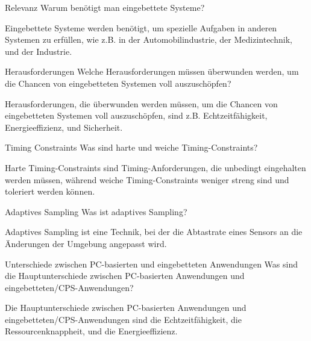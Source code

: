 \documentclass{article}
\begin{document}
\begin{exercise}{Relevanz}
  Warum benötigt man eingebettete Systeme?

  \begin{solution}
    Eingebettete Systeme werden benötigt, um spezielle Aufgaben in anderen Systemen zu erfüllen, wie z.B. in der Automobilindustrie, der Medizintechnik, und der Industrie.
  \end{solution}
\end{exercise}

\begin{exercise}{Herausforderungen}
  Welche Herausforderungen müssen überwunden werden, um die Chancen von eingebetteten Systemen voll auszuschöpfen?

  \begin{solution}
    Herausforderungen, die überwunden werden müssen, um die Chancen von eingebetteten Systemen voll auszuschöpfen, sind z.B. Echtzeitfähigkeit, Energieeffizienz, und Sicherheit.
  \end{solution}
\end{exercise}

\begin{exercise}{Timing Constraints}
  Was sind harte und weiche Timing-Constraints?

  \begin{solution}
    Harte Timing-Constraints sind Timing-Anforderungen, die unbedingt eingehalten werden müssen, während weiche Timing-Constraints weniger streng sind und toleriert werden können.
  \end{solution}
\end{exercise}

\begin{exercise}{Adaptives Sampling}
  Was ist adaptives Sampling?

  \begin{solution}
    Adaptives Sampling ist eine Technik, bei der die Abtastrate eines Sensors an die Änderungen der Umgebung angepasst wird.
  \end{solution}
\end{exercise}

\begin{exercise}{Unterschiede zwischen PC-basierten und eingebetteten Anwendungen}
  Was sind die Hauptunterschiede zwischen PC-basierten Anwendungen und eingebetteten/CPS-Anwendungen?

  \begin{solution}
    Die Hauptunterschiede zwischen PC-basierten Anwendungen und eingebetteten/CPS-Anwendungen sind die Echtzeitfähigkeit, die Ressourcenknappheit, und die Energieeffizienz.
  \end{solution}
\end{exercise}
\end{document}

